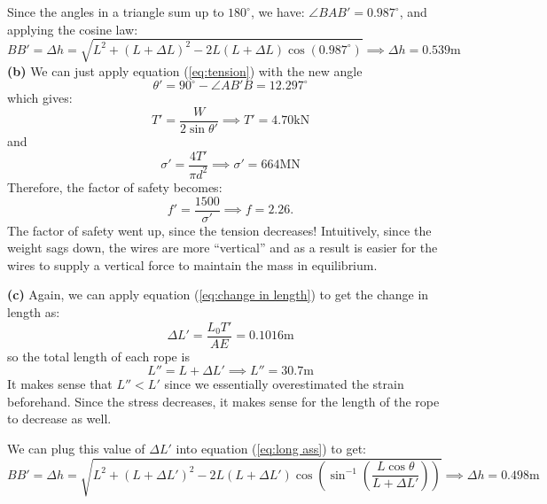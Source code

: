 \documentclass{article}
\begin{document}
Since the angles in a triangle sum up to $180^\circ$, we have: $\angle BAB' = 0.987^\circ$, and applying the cosine law:
\begin{equation}
    BB' = \Delta h = \sqrt{L^2+(L+\Delta L)^2-2L(L+\Delta L)\cos(0.987^\circ)} \implies \boxed{\Delta h= 0.539\si{\meter}}
    \label{eq:long ass}
\end{equation}
\textbf{(b)} We can just apply equation (\ref{eq:tension}) with the new angle
\begin{equation}
    \theta'=90^\circ-\angle AB'B=12.297^\circ
    \label{eq:}
\end{equation}
which gives:
\begin{equation}
    T' = \frac{W}{2\sin\theta'}\implies \boxed{T' = 4.70\si{\kilo\newton}}
    \label{eq:}
\end{equation}
and
\begin{equation}
    \sigma' = \frac{4T'}{\pi d^2} \implies \boxed{\sigma' = 664\si{\mega\newton}}
    \label{eq:}
\end{equation}
Therefore, the factor of safety becomes:
\begin{equation}
    f' = \frac{1500}{\sigma'} \implies \boxed{f = 2.26}.
    \label{eq:}
\end{equation}
The factor of safety went up, since the tension decreases! Intuitively, since the weight sags down, the wires are more ``vertical'' and as a result is easier for the wires to supply a vertical force to maintain the mass in equilibrium.

\textbf{(c)} Again, we can apply equation (\ref{eq:change in length}) to get the change in length as:
\begin{equation}
    \Delta L' = \frac{L_0 T'}{AE} = 0.1016\si{\meter}
\end{equation}
so the total length of each rope is
\begin{equation}
    L'' = L + \Delta L' \implies \boxed{L''= 30.7\si{\meter}}
    \label{eq:}
\end{equation}
It makes sense that $L''<L'$ since we essentially overestimated the strain beforehand. Since the stress decreases, it makes sense for the length of the rope to decrease as well.

We can plug this value of $\Delta L'$ into equation (\ref{eq:long ass}) to get:
\begin{equation}
    BB' = \Delta h = \sqrt{L^2+(L+\Delta L')^2-2L(L+\Delta L')\cos\left(\sin^{-1}\left(\frac{L \cos\theta}{L+\Delta L'}\right)\right)} \implies \boxed{\Delta h = 0.498\si{\meter}}
    \label{eq:}
\end{equation}
\end{document}
